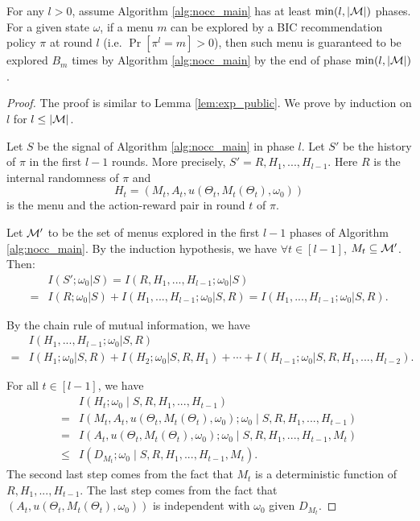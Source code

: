 \begin{lemma}
\label{lem:exp_nocc}
For any $l > 0$, assume Algorithm \ref{alg:nocc_main} has at least $\min(l, |\mathcal{M}|)$ phases.
For a given state $\omega$, if a menu $m$ can be explored by a BIC recommendation policy $\pi$ at round $l$ (i.e. $ \Pr[\pi^l= m]> 0$), then such menu is guaranteed to be explored $B_m$ times by Algorithm \ref{alg:nocc_main} by the end of phase $\min(l, |\mathcal{M}|)$.
\end{lemma}

\begin{proof}
The proof is similar to Lemma \ref{lem:exp_public}. We prove by induction on $l$ for $l \leq |\mathcal{M}|$.


Let $S$ be the signal of Algorithm \ref{alg:nocc_main} in phase $l$. Let $S'$ be the history of $\pi$ in the first $l-1$ rounds. More precisely, $S' = R, H_1,...,H_{l-1}$. Here $R$ is the internal randomness of $\pi$ and
\[ H_t = (M_t, A_t,u(\Theta_t, M_t(\Theta_t), \omega_0))\]
is the menu and the action-reward pair in round $t$ of $\pi$.

Let $\mathcal{M}'$ to be the set of menus explored in the first $l-1$ phases of Algorithm \ref{alg:nocc_main}. By the induction hypothesis, we have $\forall t\in[l-1]$, $M_t \subseteq \mathcal{M}'$. Then:
\begin{align*}
&I(S'; \omega_0| S) = I(R,H_1,...,H_{l-1}; \omega_0| S)  \\
= &I(R; \omega_0| S) + I(H_1,...,H_{l-1}; \omega_0|S, R) = I(H_1,...,H_{l-1}; \omega_0|S, R).
\end{align*}

By the chain rule of mutual information, we have
\begin{align*}
& I(H_1,...,H_{l-1}; \omega_0|S, R) \\
 =& I(H_1;\omega_0|S,R) + I(H_2;\omega_0|S, R ,H_1) + \cdots + I(H_{l-1}; \omega_0|S,R,H_1,...,H_{l-2}).
\end{align*}

For all $t \in [l-1]$, we have
\begin{align*}
&I(H_t; \omega_0 \mid S,R,H_1,...,H_{t-1}) \\
=& I(M_t,A_t, u(\Theta_t, M_t(\Theta_t), \omega_0); \omega_0 \mid S,R,H_1,...,H_{t-1}) \\
=& I(A_t, u(\Theta_t, M_t(\Theta_t), \omega_0); \omega_0  \mid  S,R,H_1,...,H_{t-1}, M_t)\\
\leq& I(D_{M_t}; \omega_0 \mid S,R,H_1,...,H_{t-1},M_t).
\end{align*}
The second last step comes from the fact that $M_t$ is a deterministic function of $R,H_1,...,H_{t-1}$. The last step comes from the fact that $(A_t,u(\Theta_t, M_t(\Theta_t), \omega_0))$ is independent with $\omega_0$ given $D_{M_t}$.


\end{proof}
